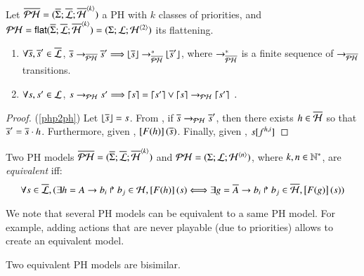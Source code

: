 \begin{theorem}
\label{thm:bisimPHP}
  Let $\ov{\PH} = (\ov{\PHs}; \ov{\PHl}; \ov{\PHa}^{\angles{k}})$ a PH with $k$ classes of priorities,
  and $\PH = \PHflat(\ov{\PHs}; \ov{\PHl}; \ov{\PHa}^{\angles{k}}) = (\PHs; \PHl; \PHa^{\angles{2}})$ its flattening.
  \begin{enumerate}
    \item \label{php2ph} $\forall \os, \os' \in \ov{\PHl}$,
      $\os \PHPtrans[\oPH] \os' \Longrightarrow \flats{\os} \PHPtrans[\oPH]^* \flats{\os'}$,
      where $\PHPtrans[\oPH]^*$ is a finite sequence of $\PHPtrans[\oPH]$ transitions.

    \item \label{ph2php} $\forall s, s' \in \PHl$,
      $s \PHPtrans s' \Longrightarrow \unflats{s} = \unflats{s'} \vee
      \unflats{s} \PHPtrans \unflats{s'}\enspace.$
  \end{enumerate}
\end{theorem}
%
\begin{proof}
  (\ref{php2ph}) Let $\flats{\os} = s$.
    From , if $\os \PHPtrans[\PH] \os'$,
    then there exists $h \in \ov{\PHh}$ so that $\os' = \os \PHplay h$.
    Furthermore, given , $\Fsem{\F(h)}{\os}$.
    Finally, given , $\PHget{s}{f^{h,i}}$
  
  
\end{proof}







\begin{definition}\label{def:equiv}
  Two PH models $\ov{\PH} = (\ov{\PHs}; \ov{\PHl}; \ov{\PHh}^\angles{k})$ and $\PH = (\PHs; \PHl; \PHh^\angles{n})$,
  where $k, n \in \sN^*$,
  are \emph{equivalent} iff:
  $$\forall s \in \ov{\PHl}, ( \exists h = \PHhit{A}{b_i}{b_j} \in \PHh, \Fsem{\F(h)}{s}
    \Longleftrightarrow \exists g = \PHhit{\ov{A}}{b_i}{b_j} \in \ov{\PHh}, \Fsem{\F(g)}{s} )$$
\end{definition}

We note that several PH models can be equivalent to a same PH model.
For example, adding actions that are never playable (due to priorities) allows to create an equivalent model.

\begin{theorem}
  Two equivalent PH models are bisimilar.
\end{theorem}

